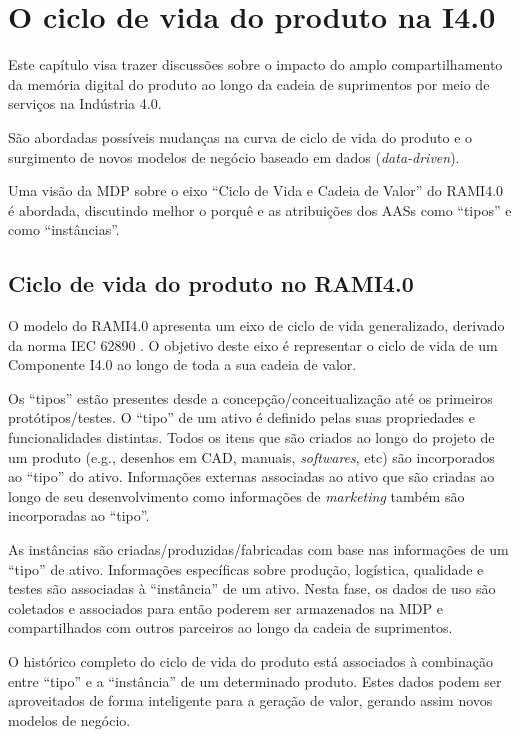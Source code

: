 \chapter{O ciclo de vida do produto na I4.0}
\label{cha:ciclo-de-vida}
	
	Este capítulo visa trazer discussões sobre o impacto do amplo compartilhamento da memória digital do produto ao longo da cadeia de suprimentos por meio de serviços na Indústria 4.0.
	
	São abordadas possíveis mudanças na curva de ciclo de vida do produto e o surgimento de novos modelos de negócio baseado em dados (\textit{data-driven}).
	
	Uma visão da MDP sobre o eixo ``Ciclo de Vida e Cadeia de Valor'' do RAMI4.0 é abordada, discutindo melhor o porquê e as atribuições dos AASs como ``tipos'' e como ``instâncias''.
	

\section{Ciclo de vida do produto no RAMI4.0}
	
	O modelo do RAMI4.0 apresenta um eixo de ciclo de vida generalizado, derivado da norma IEC 62890 \cite{adolphs2015rami}. O objetivo deste eixo é representar o ciclo de vida de um Componente I4.0 ao longo de toda a sua cadeia de valor.
	
	Os ``tipos'' estão presentes desde a concepção/conceitualização até os primeiros protótipos/testes. O ``tipo'' de um ativo é definido pelas suas propriedades e funcionalidades distintas. Todos os itens que são criados ao longo do projeto de um produto (e.g., desenhos em CAD, manuais, \textit{softwares}, etc) são incorporados ao ``tipo'' do ativo. Informações externas associadas ao ativo que são criadas ao longo de seu desenvolvimento como informações de \textit{marketing} também são incorporadas ao ``tipo''.
	
	As instâncias são criadas/produzidas/fabricadas com base nas informações de um ``tipo'' de ativo. Informações específicas sobre produção, logística, qualidade e testes são associadas à ``instância'' de um ativo. Nesta fase, os dados de uso são coletados e associados para então poderem ser armazenados na MDP e compartilhados com outros parceiros ao longo da cadeia de suprimentos. 
	
	O histórico completo do ciclo de vida do produto está associados à combinação entre ``tipo'' e a ``instância'' de um determinado produto. Estes dados podem ser aproveitados de forma inteligente para a geração de valor, gerando assim novos modelos de negócio.
	
